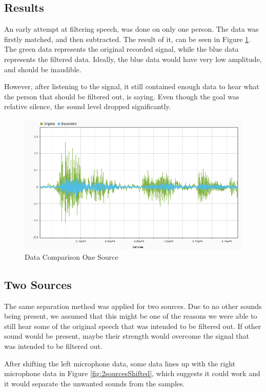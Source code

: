 \newpage
\subsection*{Results}
An early attempt at filtering speech, was done on only one person. The data was firstly matched, and then 
subtracted. The result of it, can be seen in Figure \ref{fig:oneSourceSepAndOG}. The green data represents 
the original recorded signal, while the blue data represents the filtered data. Ideally, the blue data would
have very low amplitude, and should be inaudible.

However, after listening to the signal, it still contained enough data to hear what the person that should be
filtered out, is saying. Even though the goal was relative silence, the sound level dropped significantly.

\begin{figure}[htp]
  \centering
  \includegraphics[width=\linewidth]{Illustrations/OnePersonOriginalAndSeparated.png}
  \caption{Data Comparison One Source}
  \label{fig:oneSourceSepAndOG}
\end{figure}

\newpage

\subsection{Two Sources}
The same separation method was applied for two sources. Due to no other sounds being present,
we assumed that this might be one of the reasons we were able to still hear some of the original speech
that was intended to be filtered out. If other sound would be present, maybe their strength would overcome
the signal that was intended to be filtered out.

After shifting the left microphone data, some data lines up with the right microphone data in Figure 
\ref{fig:2sourcesShifted}, which suggests it could work and it would separate the unwanted sounds from the 
samples. 


